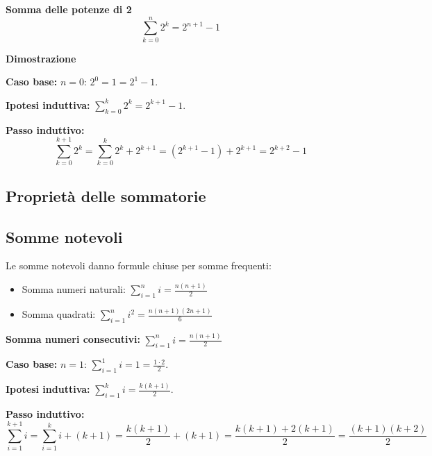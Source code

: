 \begin{esempio}
\textbf{Somma delle potenze di 2}
\[
\sum_{k=0}^n 2^k = 2^{n+1} - 1
\]


\textbf{Dimostrazione}

\textbf{Caso base:} $n=0$: $2^0=1=2^1-1$.

\textbf{Ipotesi induttiva:} $\sum_{k=0}^k 2^k = 2^{k+1}-1$.

\textbf{Passo induttivo:}
\[
\sum_{k=0}^{k+1} 2^k = \sum_{k=0}^k 2^k + 2^{k+1} = (2^{k+1}-1) + 2^{k+1} = 2^{k+2}-1
\]

\end{esempio}













\subsection{Proprietà delle sommatorie}


\subsection{Somme notevoli}

Le somme notevoli danno formule chiuse per somme frequenti:

\begin{itemize}
    \item Somma numeri naturali: $\sum_{i=1}^n i = \frac{n(n+1)}{2}$
    \item Somma quadrati: $\sum_{i=1}^n i^2 = \frac{n(n+1)(2n+1)}{6}$
\end{itemize}

\begin{esempio}
\textbf{Somma numeri consecutivi: }$\displaystyle\sum_{i=1}^n i = \frac{n(n+1)}{2}$


\textbf{Caso base:} $n=1$: $\sum_{i=1}^1 i=1=\frac{1\cdot2}{2}$.

\textbf{Ipotesi induttiva:} $\sum_{i=1}^k i=\frac{k(k+1)}{2}$.

\textbf{Passo induttivo:}
\[
\sum_{i=1}^{k+1} i = \sum_{i=1}^k i + (k+1) = \frac{k(k+1)}{2} + (k+1) = \frac{k(k+1)+2(k+1)}{2} = \frac{(k+1)(k+2)}{2}
\]
\end{esempio}

